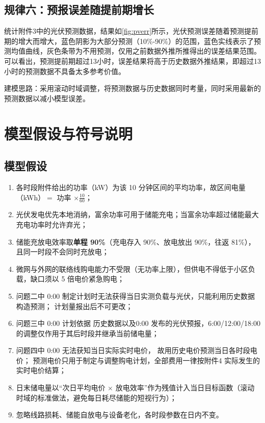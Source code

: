 \documentclass[withoutpreface,bwprint]{cumcmthesis}
\begin{document}
\subsection{规律六：预报误差随提前期增长}
统计附件3中的光伏预测数据，结果如\cref{fig:pverr}所示，光伏预测误差随着预测提前期的增大而增大，蓝色阴影为大部分预测（10\%-90\%）的范围，蓝色实线表示了预测均值曲线，灰色条带为不用预测，仅用之前数据外推所推得出的误差结果范围。可以看出，预测提前期超过13小时，误差结果将高于历史数据外推结果，即超过13小时的预测数据不具备太多参考价值。

建模思路：采用滚动时域调整，将预测数据与历史数据同时考量，同时采用最新的预测数据以减小模型误差。






\section{模型假设与符号说明}
\label{sec:assume}

\subsection{模型假设}

\begin{enumerate}[label=\textbf{假设\arabic*.}, leftmargin=4.2em, itemsep=2pt]
\item 各时段附件给出的功率（kW）为该 10 分钟区间的平均功率，故区间电量（kWh）$=$ 功率 $\times \frac{10}{60}$；
\item 光伏发电优先本地消纳，富余功率可用于储能充电；当富余功率超过储能最大充电功率时允许弃光；
\item 储能充放电效率取\textbf{单程 90\%}（充电存入 90\%、放电放出 90\%，往返 81\%），且同一时段不会同时充放电；
\item 微网与外网的联络线购电能力不受限（无功率上限），但供电不得低于小区负载，缺口须以 5 倍电价紧急购电；
\item 问题二中 0:00 制定计划时无法获得当日实测负载与光伏，只能利用历史数据构造预测；
计划量报出后不可更改；
\item 问题三中 0:00 计划依据 历史数据以及0:00 发布的光伏预报，6:00/12:00/18:00 的调整仅作用于其后时段并继承当前储电量；
\item 问题四中 0:00 无法获知当日实际实时电价，
故用历史电价预测当日各时段电价；
预测电价只用于制定与调整购电计划，全部费用一律按附件4 实际发生的实时电价结算；
\item 日末储电量以“次日平均电价 $\times$ 放电效率”作为残值计入当日目标函数（滚动时域的标准做法，避免每日耗尽储能的短视行为）；
\item 忽略线路损耗、储能自放电与设备老化，各时段参数在日内不变。
\end{enumerate}
\end{document}
